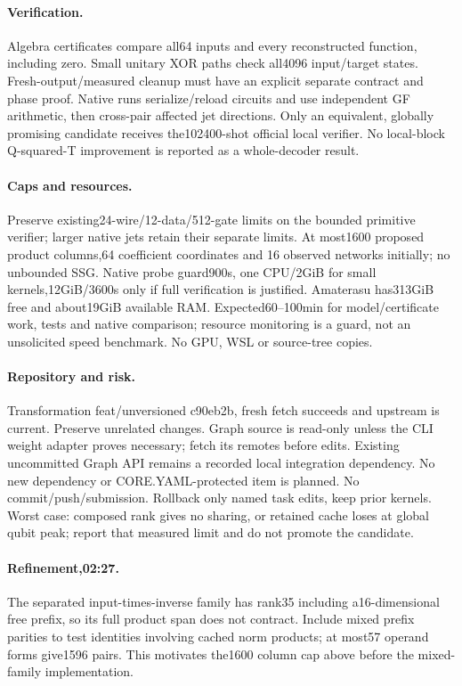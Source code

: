 \documentclass{article}
\begin{document}
\paragraph{Verification.} Algebra certificates compare all64 inputs and every
reconstructed function, including zero. Small unitary XOR paths check all4096
input/target states. Fresh-output/measured cleanup must have an explicit separate
contract and phase proof. Native runs serialize/reload circuits and use independent
GF arithmetic, then cross-pair affected jet directions. Only an equivalent,
globally promising candidate receives the102400-shot official local verifier.
No local-block Q-squared-T improvement is reported as a whole-decoder result.
\paragraph{Caps and resources.} Preserve existing24-wire/12-data/512-gate
limits on the bounded primitive verifier; larger native jets retain their separate
limits. At most1600 proposed product columns,64 coefficient coordinates and
16 observed networks initially; no unbounded SSG. Native probe guard900s,
one CPU/2GiB for small kernels,12GiB/3600s only if full verification is justified.
Amaterasu has313GiB free and about19GiB available RAM. Expected60--100min for
model/certificate work, tests and native comparison; resource monitoring is a
guard, not an unsolicited speed benchmark. No GPU, WSL or source-tree copies.
\paragraph{Repository and risk.} Transformation feat/unversioned c90eb2b,
fresh fetch succeeds and upstream is current. Preserve unrelated changes.
Graph source is read-only unless the CLI weight adapter proves necessary; fetch
its remotes before edits. Existing uncommitted Graph API remains a recorded local
integration dependency. No new dependency or CORE.YAML-protected item is planned.
No commit/push/submission. Rollback only named task edits, keep prior kernels.
Worst case: composed rank gives no sharing, or retained cache loses at global
qubit peak; report that measured limit and do not promote the candidate.
\paragraph{Refinement,02:27.} The separated input-times-inverse family has
rank35 including a16-dimensional free prefix, so its full product span does
not contract. Include mixed prefix parities to test identities involving
cached norm products; at most57 operand forms give1596 pairs. This motivates
the1600 column cap above before the mixed-family implementation.
\end{document}
